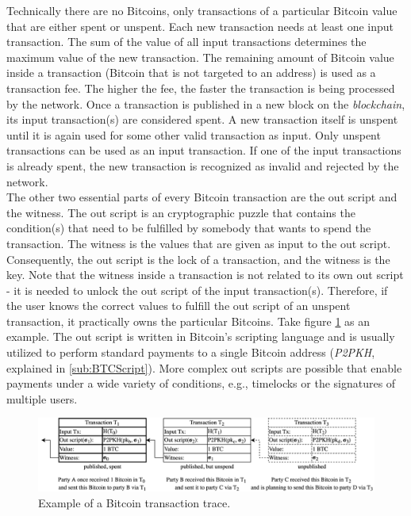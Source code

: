 \documentclass{cacthesis}
\begin{document}
        Technically there are no Bitcoins, only transactions of a particular Bitcoin value that are either spent or unspent. Each new transaction needs at least one input transaction. The sum of the value of all input transactions determines the maximum value of the new transaction. The remaining amount of Bitcoin value inside a transaction (Bitcoin that is not targeted to an address) is used as a transaction fee. The higher the fee, the faster the transaction is being processed by the network. Once a transaction is published in a new block on the \textit{blockchain}, its input transaction(s) are considered spent. A new transaction itself is unspent until it is again used for some other valid transaction as input. Only unspent transactions can be used as an input transaction. If one of the input transactions is already spent, the new transaction is recognized as invalid and rejected by the network. \\
        The other two essential parts of every Bitcoin transaction are the out script and the witness. The out script is an cryptographic puzzle that contains the condition(s) that need to be fulfilled by somebody that wants to spend the transaction. The witness is the values that are given as input to the out script. Consequently, the out script is the lock of a transaction, and the witness is the key. Note that the witness inside a transaction is not related to its own out script - it is needed to unlock the out script of the input transaction(s). Therefore, if the user knows the correct values to fulfill the out script of an unspent transaction, it practically owns the particular Bitcoins. Take figure \ref{fig:tx1} as an example. The out script is written in Bitcoin's scripting language and is usually utilized to perform standard payments to a single Bitcoin address (\textit{P2PKH}, explained in \ref{sub:BTCScript}). More complex out scripts are possible that enable payments under a wide variety of conditions, e.g., timelocks or the signatures of multiple users.
        \begin{figure}
          \includegraphics[width=\linewidth]{images/basic_transaction_figure.png}
          \caption{Example of a Bitcoin transaction trace.}
          \label{fig:tx1}
        \end{figure}
\end{document}
